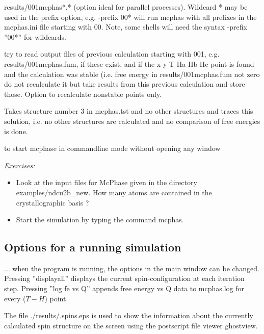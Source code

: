 \begin{description}
 		    results/001mcphas*.* (option ideal for parallel processes).
                   Wildcard * may be used in the prefix option, e.g.  -prefix 00* will run
                   {\prg mcphas} with all prefixes in the mcphas.ini file starting with 00.
                   Note, some shells will need the syntax  -prefix ''00*'' for wildcards.
 \item[\prg           -read  001 ]   try to read output files of previous calculation starting
 		     with 001, e.g. results/001mcphas.fum, if these exist, and if 
 		    the x-y-T-Ha-Hb-Hc point is found and the calculation was stable 
                   (i.e. free energy in results/001mcphas.fum not zero do not 
                   recalculate it but take results from this previous calculation
 		     and store those. Option to recalculate nonstable points only.
\item[\prg   -t 3]  Takes structure number 3 in {\prg mcphas.tst } and no other structures
                   and traces this solution, i.e. no other structures are calculated and no comparison of
                   free energies is done.
\item[\prg mcphasit\index{mcphas}] to start mcphase in commandline mode without opening any window
\end{description}

\vspace{1cm}
{\em Exercises:}
\begin{itemize}
\item Look at the input files for {\prg McPhase} given in the directory
{\prg examples/ndcu2b\_new}.  How many atoms are contained in the crystallographic basis ?
\item
Start the simulation by typing the command {\prg mcphas}.
\end{itemize}



\subsection{Options for a running simulation}
... when the program is running, the options in the main window
can be changed. Pressing ''displayall'' displays the current spin-configuration
at each iteration step. Pressing ''log fe vs Q'' appends free energy vs Q
data to {\prg mcphas.log} for every ($T-H$) point.


The file {\prg ./results/.spins.eps} is used to show the information about the currently calculated
spin structure on the screen using the postscript file viewer ghostview.

